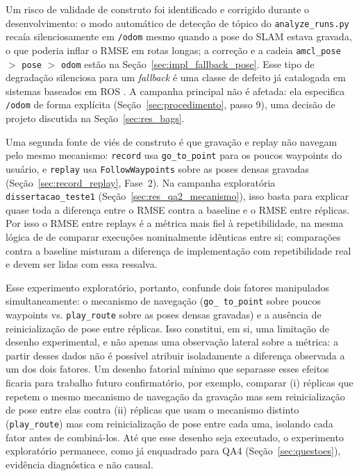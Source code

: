 Um risco de validade de construto foi identificado e corrigido durante o
desenvolvimento: o modo automático de detecção de tópico do
\texttt{analyze\_\allowbreak runs.py} recaía silenciosamente em \texttt{/\allowbreak odom}
mesmo quando a pose do SLAM estava gravada, o que poderia inflar o RMSE em rotas
longas; a correção e a cadeia \texttt{amcl\_\allowbreak pose} $>$ \texttt{pose} $>$
\texttt{odom} estão na Seção~\ref{sec:impl_fallback_pose}. Esse tipo de
degradação silenciosa para um \textit{fallback} é uma classe de defeito já
catalogada em sistemas baseados em ROS \cite{timperley2024}. A campanha
principal não é afetada: ela especifica \texttt{/\allowbreak odom} de forma
explícita (Seção~\ref{sec:procedimento}, passo 9), uma decisão de projeto
discutida na Seção~\ref{sec:res_bags}.

Uma segunda fonte de viés de construto é que gravação e replay não navegam
pelo mesmo mecanismo: \texttt{record} usa \texttt{go\_\allowbreak to\_\allowbreak point}
para os poucos waypoints do usuário, e \texttt{replay} usa
\texttt{FollowWaypoints} sobre as poses densas gravadas
(Seção~\ref{sec:record_replay}, Fase~2). Na campanha exploratória
\texttt{dissertacao\_\allowbreak teste1} (Seção~\ref{sec:res_qa2_mecanismo}), isso
basta para explicar quase toda a diferença entre o RMSE contra a baseline e o
RMSE entre réplicas. Por isso o RMSE entre replays é a métrica mais fiel à
repetibilidade, na mesma lógica de  de comparar execuções
nominalmente idênticas entre si; comparações contra a baseline misturam a
diferença de implementação com repetibilidade real e devem ser lidas com essa
ressalva.

Esse experimento exploratório, portanto, confunde dois fatores manipulados
simultaneamente: o mecanismo de navegação (\texttt{go\_\allowbreak
to\_\allowbreak point} sobre poucos waypoints vs. \texttt{play\_\allowbreak route} sobre
as poses densas gravadas)
e a ausência de reinicialização de pose entre réplicas. Isso constitui, em
si, uma limitação de desenho experimental, e não apenas uma observação lateral
sobre a métrica: a partir desses dados não é possível atribuir isoladamente a
diferença observada a um dos dois fatores. Um desenho fatorial mínimo que
separasse esses efeitos ficaria para trabalho futuro confirmatório, por
exemplo, comparar (i) réplicas que repetem o mesmo mecanismo de navegação da
gravação mas sem reinicialização de pose entre elas contra (ii) réplicas que
usam o mecanismo distinto (\texttt{play\_\allowbreak route}) mas com
reinicialização de pose entre cada uma, isolando cada fator antes de
combiná-los. Até que esse desenho seja executado, o experimento exploratório
permanece, como já enquadrado para QA4 (Seção~\ref{sec:questoes}), evidência
diagnóstica e não causal.

